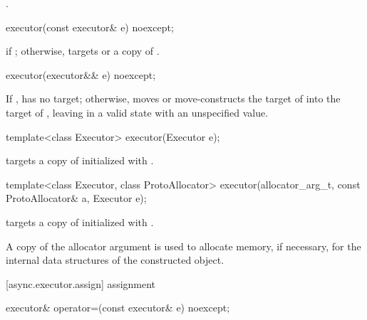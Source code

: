 \begin{itemdescr}
\pnum
\postconditions {}.
\end{itemdescr}

\begin{itemdecl}
executor(const executor& e) noexcept;
\end{itemdecl}

\begin{itemdescr}
\pnum
\postconditions {} if ; otherwise,  targets  or a copy of .
\end{itemdescr}

\begin{itemdecl}
executor(executor&& e) noexcept;
\end{itemdecl}

\begin{itemdescr}
\pnum
\effects If ,  has no target; otherwise, moves  or move-constructs the target of  into the target of , leaving  in a valid state with an unspecified value.
\end{itemdescr}

\begin{itemdecl}
template<class Executor> executor(Executor e);
\end{itemdecl}

\begin{itemdescr}
\pnum
\effects {} targets a copy of  initialized with .
\end{itemdescr}

\begin{itemdecl}
template<class Executor, class ProtoAllocator>
  executor(allocator_arg_t, const ProtoAllocator& a, Executor e);
\end{itemdecl}

\begin{itemdescr}
\pnum
\effects {} targets a copy of  initialized with .

\pnum
A copy of the allocator argument is used to allocate memory, if necessary, for the internal data structures of the constructed  object.
\end{itemdescr}



[async.executor.assign]{ assignment}

\begin{itemdecl}
executor& operator=(const executor& e) noexcept;
\end{itemdecl}

